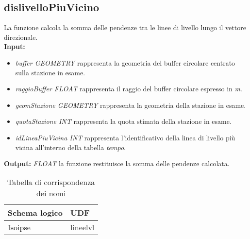 \subsection{dislivelloPiuVicino}
La funzione calcola la somma delle pendenze tra le linee di livello lungo il vettore direzionale.\\
\textbf{Input:} 
\begin{itemize}
\item \textit{buffer GEOMETRY} rappresenta la geometria del buffer circolare centrato sulla stazione in esame.
\item \textit{raggioBuffer FLOAT} rappresenta il raggio del buffer circolare espresso in \textit{m}.
\item \textit{geomStazione GEOMETRY} rappresenta la geometria della stazione in esame.
\item \textit{quotaStazione INT} rappresenta la quota stimata della stazione in esame.
\item \textit{idLineaPiuVicina INT} rappresenta l'identificativo della linea di livello più vicina all'interno della tabella \textit{tempo}.
\end{itemize}
\textbf{Output:} \textit{FLOAT} la funzione restituisce la somma delle pendenze calcolata. 

\begin{table}[h]
\centering
\caption{Tabella di corrispondenza dei nomi}
\label{mapTb3}
\begin{tabular}{|l|l|}
\hline
Schema logico & UDF      \\ \hline
Isoipse       & lineelvl \\ \hline
\end{tabular}
\end{table} 

